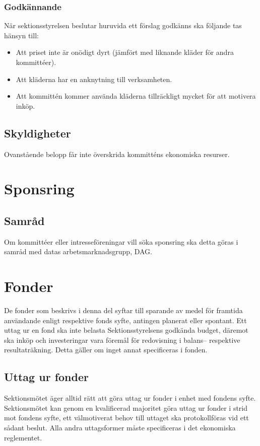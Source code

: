\documentclass[a4paper]{dtek}
\begin{document}
\subsubsection{Godkännande}
När sektionsstyrelsen beslutar huruvida ett förslag godkänns ska följande tas hänsyn till:
\begin{itemize}
    \item Att priset inte är onödigt dyrt (jämfört med liknande kläder för andra kommittéer).
    \item Att kläderna har en anknytning till verksamheten.
    \item Att kommittén kommer använda kläderna tillräckligt mycket för att motivera inköp.
\end{itemize}

\subsection{Skyldigheter}
Ovanstående belopp får inte överskrida kommitténs ekonomiska resurser. \\
\section{Sponsring}
\subsection{Samråd}
Om kommittéer eller intresseföreningar vill söka sponsring ska detta göras i samråd med datas arbetsmarknadsgrupp, DAG.
\section{Fonder}
De fonder som beskrivs i denna del syftar till sparande av medel för framtida användande enligt respektive fonds syfte, antingen planerat eller spontant. Ett uttag ur en fond ska inte belasta Sektionsstyrelsens godkända budget, däremot ska inköp och investeringar vara föremål för redovisning i balans– respektive resultaträkning. Detta gäller om inget annat specificeras i fonden.

\subsection{Uttag ur fonder}
Sektionsmötet äger alltid rätt att göra uttag ur fonder i enhet med fondens syfte. Sektionsmötet kan genom en kvalificerad majoritet göra uttag ur fonder i strid mot fondens syfte, ett välmotiverat behov till uttaget ska protokollföras vid ett sådant beslut. Alla andra uttagsformer måste specificeras i det ekonomiska reglementet.
\end{document}
